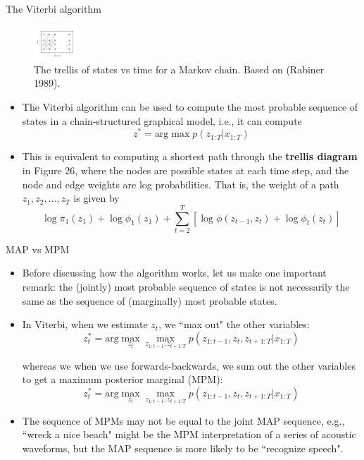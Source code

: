 \documentclass[10pt,mathserif]{beamer}
\begin{document}
\begin{frame}{The Viterbi algorithm}
\begin{figure}[h]
\centering
\includegraphics[width=0.15\textwidth]{markovTrellis}
\caption{The trellis of states vs time for a Markov chain. Based on (Rabiner 1989).}
\end{figure}

\begin{itemize}
    \item  The Viterbi algorithm can be used to compute the most probable sequence of states in a chain-structured graphical model, i.e., it can compute
    \begin{equation}
        z^* = \text{arg} \max p(z_{1:T} |x_{1:T} )
    \end{equation}
    
    \item  This is equivalent to computing a shortest path through the \textbf{trellis diagram} in Figure 26, where the nodes are possible states at each time step, and the node and edge weights are log probabilities. That is, the weight of a path $z_1,z_2,...,z_T$ is given by
    \begin{equation}
        \log \pi_1(z_1) + \log \phi_1(z_1) +  \sum_{t=2}^T [\log \phi(z_{t-1}, z_t ) + \log \phi_t (z_t )]
    \end{equation}
\end{itemize}
\end{frame}

\begin{frame}{MAP vs MPM}
\begin{itemize}
    \item Before discussing how the algorithm works, let us make one important remark: the (jointly) most probable sequence of states is not necessarily the same as the sequence of (marginally) most probable states.
    \item In Viterbi, when we estimate $z_t$, we ``max out" the other variables:
    \begin{equation}
        z_t^* =\text{arg}\max_{z_t} \max_{z_{1:t -1} ,z_{t +1:T}} p(z_{1:t -1},z_t,z_{t+1:T}|x_{1:T})
    \end{equation}
    
    whereas we when we use forwards-backwards, we sum out the other variables to get a maximum posterior marginal (MPM):
    \begin{equation}
        z_t^* =\text{arg}\max_{z_t} \max_{z_{1:t -1} ,z_{t +1:T}} p(z_{1:t -1},z_t,z_{t+1:T}|x_{1:T})
    \end{equation}
    
    \item The sequence of MPMs may not be equal to the joint MAP sequence, e.g., ``wreck a nice beach" might be the MPM interpretation of a series of acoustic waveforms, but the MAP sequence is more likely to be ``recognize speech".
\end{itemize}
\end{frame}
\end{document}
